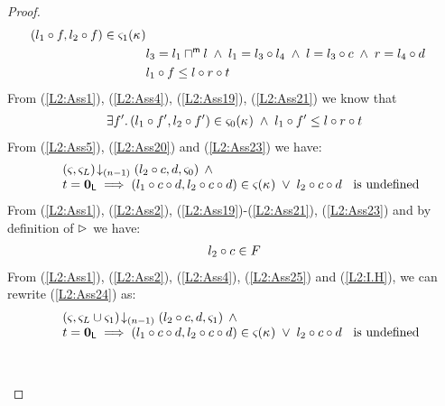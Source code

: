 \begin{lemma}[]
\begin{proof}
\begin{align}
	(l_1 \circ f, l_2 \circ f) \in \varsigma_{1}(\kappa_{}) \label{L2:Ass19}\\
	&l_3 = l_1 \sqcap_{}^{\textsf{m}} l \;\land\; l_1 = l_3 \circ l_4 \;\land\; l = l_3 \circ c \;\land\; r = l_4 \circ d\label{L2:Ass20}\\
	&l_1 \circ f \leq l \circ r \circ t\label{L2:Ass21}
\end{align}
From (\ref{L2:Ass1}), (\ref{L2:Ass4}), (\ref{L2:Ass19}), (\ref{L2:Ass21}) we know that 
%
\begin{align}
	\exists f'.\, (l_1 \circ f', l_2 \circ f') \in \varsigma_{0}(\kappa_{}) \;\land\; l_1 \circ f' \leq l \circ r \circ t \label{L2:Ass23}
\end{align}
%
From (\ref{L2:Ass5}), (\ref{L2:Ass20}) and (\ref{L2:Ass23}) we have:
%
\begin{align}
	\begin{array}{l l}
		&\left(\varsigma_{}, \varsigma_{L}\right) \!\downarrow_{(n-1)} \left(l_2 \circ c, d, \varsigma_{0}\right) \;\land\\
		& t = \mathbf{0}_{\textsf{L}} \implies (l_1 \circ c \circ d, l_2 \circ c \circ d) \in \varsigma_{}(\kappa_{}) \;\lor\; l_2 \circ c \circ d \hspace*{0.2cm}\text{ is undefined}
	\end{array} \label{L2:Ass24}
\end{align}
From (\ref{L2:Ass1}), (\ref{L2:Ass2}), (\ref{L2:Ass19})-(\ref{L2:Ass21}), (\ref{L2:Ass23}) and by definition of $\mathrel{\rhd}$ we have:
\begin{align}
	l_2 \circ c \in F \label{L2:Ass25}
\end{align}
From (\ref{L2:Ass1}), (\ref{L2:Ass2}), (\ref{L2:Ass4}), (\ref{L2:Ass25}) and (\ref{L2:I.H}), we can rewrite (\ref{L2:Ass24}) as:
%
\begin{align}
	\begin{array}{l l}
		&\left(\varsigma_{}, \varsigma_{L} \cup \varsigma_{1}\right) \!\downarrow_{(n-1)} \left(l_2 \circ c, d, \varsigma_{1}\right) \;\land\\
		& t = \mathbf{0}_{\textsf{L}} \implies (l_1 \circ c \circ d, l_2 \circ c \circ d) \in \varsigma_{}(\kappa_{}) \;\lor\; l_2 \circ c \circ d \hspace*{0.2cm}\text{ is undefined}
	\end{array} \label{L2:DismissedGoal4}
\end{align}\\\\

\end{proof}
\end{lemma}
